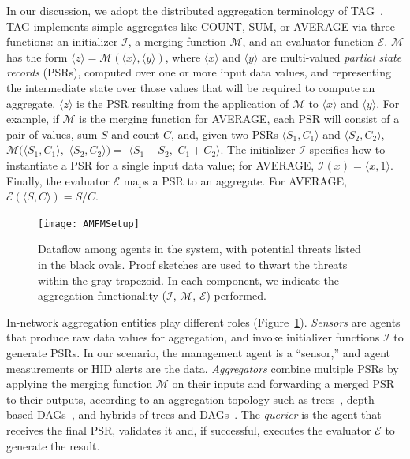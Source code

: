 \documentclass[10pt,twocolumn]{article}
\newcommand{\Proofsketches}{Proof sketches\xspace}
\newcommand{\sstitle}[1]{\noindent{\bf #1\/}}
\begin{document}
\vspace{-1em}
\sstitle{In-Network Aggregation Functionality.}
In our discussion, we adopt the distributed aggregation terminology of
TAG~\cite{Madden2002}.  TAG implements simple aggregates
like COUNT, SUM, or AVERAGE via three functions: an initializer
$\mathcal{I}$, a merging function $\mathcal{M}$, and an evaluator
function $\mathcal{E}$. $\mathcal{M}$ has the 
form $\langle  z \rangle  = \mathcal{M}(\langle  x \rangle , \langle  y \rangle )$,
where $\langle x\rangle $ and $\langle y\rangle $ are multi-valued \emph{partial state records}
(PSRs), computed over one or more input data values, and representing the
intermediate state over those values that will be required to compute
an aggregate.  $\langle z\rangle $ is the PSR resulting from the application of
$\mathcal{M}$ to $\langle x\rangle $ and $\langle y\rangle $. For example, if
$\mathcal{M}$ is the merging function for AVERAGE, each PSR will
consist of a pair of values, sum $S$ and count $C$, and,
given two PSRs $\langle S_1,C_1\rangle $ and $\langle S_2, C_2\rangle $,
$\mathcal{M}(\langle S_1, C_1\rangle ,$ $\langle S_2, C_2\rangle ) =$ $\langle S_1 + S_2,$ $C_1 + C_2\rangle $.
The initializer $\mathcal{I}$ specifies how to instantiate a PSR for
a single input data value; for AVERAGE, $\mathcal{I}(x) = \langle x, 1\rangle $. Finally, the
evaluator $\mathcal{E}$ maps a PSR to an aggregate. For AVERAGE,
$\mathcal{E}(\langle S,C\rangle ) = S/C$.

\begin{figure}
\centerline{\texttt{[image: AMFMSetup]}}
\caption{Dataflow among agents in the system, with potential threats
  listed in the black ovals.  \Proofsketches are used to
  thwart the threats within the gray trapezoid.  In each component, we
  indicate the aggregation functionality ($\mathcal{I}$, $\mathcal{M}$,
  $\mathcal{E}$) performed.}
\label{fig:setup}
\vspace*{-2em}
\end{figure}

In-network aggregation entities play different roles
(Figure~\ref{fig:setup}). {\em Sensors\/} are agents that produce raw
data values for aggregation, and invoke initializer functions
$\mathcal{I}$ to generate PSRs.  In our scenario, the management agent
is a ``sensor,'' and agent measurements or HID alerts are the data.
{\em Aggregators\/} combine multiple PSRs by applying the merging
function $\mathcal{M}$ on their inputs and forwarding a merged PSR to
their outputs, according to an aggregation topology such as
trees~\cite{Madden2002}, depth-based DAGs~\cite{Considine2004}, and
hybrids of trees and DAGs~\cite{Manjhi2005}.  The {\em querier\/} is the
agent that receives the final PSR, validates it and, if successful, executes the
evaluator $\mathcal{E}$ to generate the result.
\end{document}
